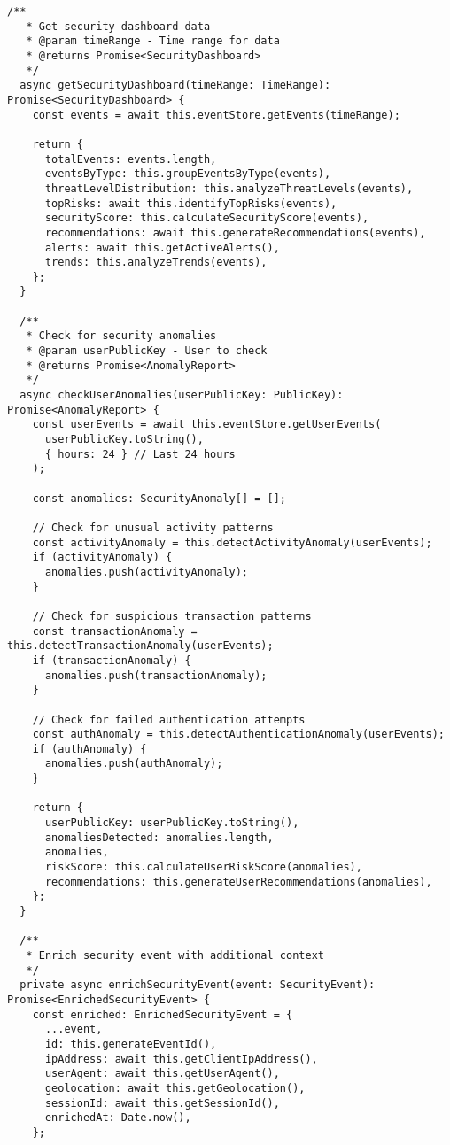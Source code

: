 \documentclass[11pt,a4paper]{article}
\begin{document}
\begin{lstlisting}[style=typescript, caption=Security Monitoring System]
  /**
   * Get security dashboard data
   * @param timeRange - Time range for data
   * @returns Promise<SecurityDashboard>
   */
  async getSecurityDashboard(timeRange: TimeRange): Promise<SecurityDashboard> {
    const events = await this.eventStore.getEvents(timeRange);
    
    return {
      totalEvents: events.length,
      eventsByType: this.groupEventsByType(events),
      threatLevelDistribution: this.analyzeThreatLevels(events),
      topRisks: await this.identifyTopRisks(events),
      securityScore: this.calculateSecurityScore(events),
      recommendations: await this.generateRecommendations(events),
      alerts: await this.getActiveAlerts(),
      trends: this.analyzeTrends(events),
    };
  }

  /**
   * Check for security anomalies
   * @param userPublicKey - User to check
   * @returns Promise<AnomalyReport>
   */
  async checkUserAnomalies(userPublicKey: PublicKey): Promise<AnomalyReport> {
    const userEvents = await this.eventStore.getUserEvents(
      userPublicKey.toString(),
      { hours: 24 } // Last 24 hours
    );

    const anomalies: SecurityAnomaly[] = [];

    // Check for unusual activity patterns
    const activityAnomaly = this.detectActivityAnomaly(userEvents);
    if (activityAnomaly) {
      anomalies.push(activityAnomaly);
    }

    // Check for suspicious transaction patterns
    const transactionAnomaly = this.detectTransactionAnomaly(userEvents);
    if (transactionAnomaly) {
      anomalies.push(transactionAnomaly);
    }

    // Check for failed authentication attempts
    const authAnomaly = this.detectAuthenticationAnomaly(userEvents);
    if (authAnomaly) {
      anomalies.push(authAnomaly);
    }

    return {
      userPublicKey: userPublicKey.toString(),
      anomaliesDetected: anomalies.length,
      anomalies,
      riskScore: this.calculateUserRiskScore(anomalies),
      recommendations: this.generateUserRecommendations(anomalies),
    };
  }

  /**
   * Enrich security event with additional context
   */
  private async enrichSecurityEvent(event: SecurityEvent): Promise<EnrichedSecurityEvent> {
    const enriched: EnrichedSecurityEvent = {
      ...event,
      id: this.generateEventId(),
      ipAddress: await this.getClientIpAddress(),
      userAgent: await this.getUserAgent(),
      geolocation: await this.getGeolocation(),
      sessionId: await this.getSessionId(),
      enrichedAt: Date.now(),
    };


\end{lstlisting}
\end{document}
